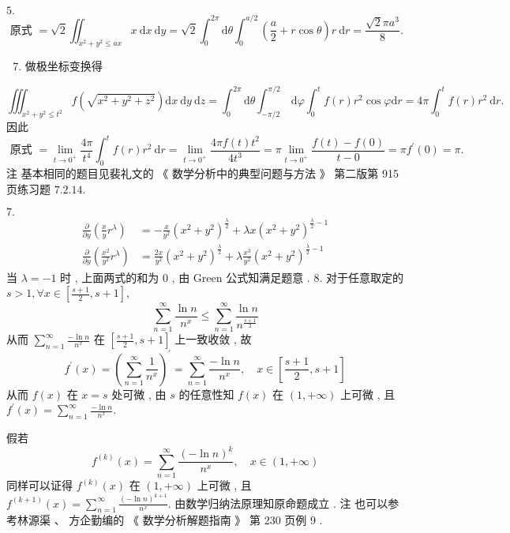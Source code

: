 \documentclass[10pt]{article}
\begin{document}
$5 .$
$$
\text { 原式 }=\sqrt{2} \iint_{x^{2}+y^{2} \leqslant a x} x \mathrm{~d} x \mathrm{~d} y=\sqrt{2} \int_{0}^{2 \pi} \mathrm{d} \theta \int_{0}^{a / 2}\left(\frac{a}{2}+r \cos \theta\right) r \mathrm{~d} r=\frac{\sqrt{2} \pi a^{3}}{8} \text {. }
$$

\begin{enumerate}
  \setcounter{enumi}{6}
  \item  做极坐标变换得 
\end{enumerate}
$$
\iiint_{x^{2}+y^{2} \leqslant t^{2}} f\left(\sqrt{x^{2}+y^{2}+z^{2}}\right) \mathrm{d} x \mathrm{~d} y \mathrm{~d} z=\int_{0}^{2 \pi} \mathrm{d} \theta \int_{-\pi / 2}^{\pi / 2} \mathrm{~d} \varphi \int_{0}^{t} f(r) r^{2} \cos \varphi \mathrm{d} r=4 \pi \int_{0}^{t} f(r) r^{2} \mathrm{~d} r .
$$
 因此 
$$
\text { 原式 }=\lim _{t \rightarrow 0^{+}} \frac{4 \pi}{t^{4}} \int_{0}^{t} f(r) r^{2} \mathrm{~d} r=\lim _{t \rightarrow 0^{+}} \frac{4 \pi f(t) t^{2}}{4 t^{3}}=\pi \lim _{t \rightarrow 0^{+}} \frac{f(t)-f(0)}{t-0}=\pi f^{\prime}(0)=\pi .
$$
 注   基本相同的题目见裴礼文的  《 数学分析中的典型问题与方法 》 第二版第  915  页练习题  $7.2 .14$.

$7 .$
$$
\begin{aligned}
\frac{\partial}{\partial y}\left(\frac{x}{y} r^{\lambda}\right) &=-\frac{x}{y^{2}}\left(x^{2}+y^{2}\right)^{\frac{\lambda}{2}}+\lambda x\left(x^{2}+y^{2}\right)^{\frac{\lambda}{2}-1} \\
\frac{\partial}{\partial y}\left(\frac{x^{2}}{y^{2}} r^{\lambda}\right) &=\frac{2 x}{y^{2}}\left(x^{2}+y^{2}\right)^{\frac{\lambda}{2}}+\lambda \frac{x^{3}}{y^{2}}\left(x^{2}+y^{2}\right)^{\frac{\lambda}{2}-1}
\end{aligned}
$$
 当  $\lambda=-1$  时 ,  上面两式的和为  0 ,  由  Green  公式知满足题意 . 8.  对于任意取定的  $s>1, \forall x \in\left[\frac{s+1}{2}, s+1\right]$,
$$
\sum_{n=1}^{\infty} \frac{\ln n}{n^{x}} \leqslant \sum_{n=1}^{\infty} \frac{\ln n}{n^{\frac{s+1}{2}}}
$$
 从而  $\sum_{n=1}^{\infty} \frac{-\ln n}{n^{x}}$  在  $\left[\frac{s+1}{2}, s+1\right]$  上一致收敛 ,  故 
$$
f^{\prime}(x)=\left(\sum_{n=1}^{\infty} \frac{1}{n^{x}}\right)^{\prime}=\sum_{n=1}^{\infty} \frac{-\ln n}{n^{x}}, \quad x \in\left[\frac{s+1}{2}, s+1\right]
$$
 从而  $f(x)$  在  $x=s$  处可微 ,  由  $s$  的任意性知  $f(x)$  在  $(1,+\infty)$  上可微 ,  且  $f^{\prime}(x)=\sum_{n=1}^{\infty} \frac{-\ln n}{n^{x}}$.

 假若 
$$
f^{(k)}(x)=\sum_{n=1}^{\infty} \frac{(-\ln n)^{k}}{n^{x}}, \quad x \in(1,+\infty)
$$
 同样可以证得  $f^{(k)}(x)$  在  $(1,+\infty)$  上可微 ,  且  $f^{(k+1)}(x)=\sum_{n=1}^{\infty} \frac{(-\ln n)^{k+1}}{n^{x}}$.  由数学归纳法原理知原命题成立 .  注   也可以参考林源渠 、 方企勤编的 《 数学分析解题指南 》 第  230  页例  9 .
\end{document}
